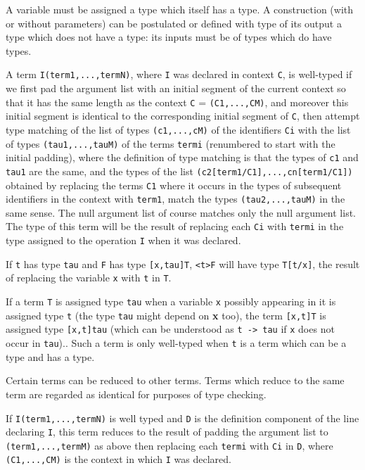 \documentclass[12pt]{article}
\begin{document}
A variable must be assigned a type which itself has a type.
A construction (with or without parameters) can be postulated or defined with type of its output a type which does not have a type:  its inputs must be of types which do have types.

A term {\tt I(term1,...,termN)}, where {\tt I} was declared in context {\tt C}, is well-typed if we first pad the argument list with an initial segment of the current context
so that it has the same length as the context {\tt C} = {\tt (C1,...,CM)}, and moreover this initial segment is identical to the corresponding initial segment of {\tt C}, then attempt type matching of the list of types {\tt (c1,...,cM)} of the identifiers {\tt Ci} with the list of types {\tt (tau1,...,tauM)} of the terms {\tt termi} (renumbered to start with the initial padding),
where the definition of type matching is that the types of {\tt c1} and {\tt tau1} are the same, and the types of the list {\tt (c2[term1/C1],...,cn[term1/C1])}  obtained by replacing the terms {\tt C1} where it occurs in the types of subsequent identifiers in the context with {\tt term1}, match the types {\tt (tau2,...,tauM)} in the same sense.  The null argument list of course matches only the null argument list.  The type of this term
will be the result of replacing each {\tt Ci} with {\tt termi} in the type assigned to the operation {\tt I} when it was declared.

If {\tt t} has type {\tt tau} and {\tt F} has type {\tt [x,tau]T}, {\tt <t>F} will have type {\tt T[t/x]}, the result of replacing the variable {\tt x} with {\tt t} in {\tt T}.

If a term {\tt T} is assigned type {\tt tau} when a variable {\tt x} possibly appearing in it is assigned type {\tt t} (the type {\tt tau} might depend on {\bf x} too), the term {\tt [x,t]T} is assigned type {\tt [x,t]tau} (which can be understood as {\tt t -> tau} if {\tt x} does not occur in {\tt tau})..  Such a term
is only well-typed when {\tt t} is a term which can be a type and has a type.

Certain terms can be reduced to other terms.   Terms which reduce to the same term are regarded as identical for purposes of type checking.

If {\tt I(term1,...,termN)} is well typed and {\tt D} is the definition component of the line declaring {\tt I}, this term reduces to the result of padding the argument
list to {\tt (term1,...,termM)} as above then replacing each {\tt termi} with {\tt Ci} in {\tt D}, where {\tt (C1,...,CM)} is the context in which {\tt I} was declared.
\end{document}
